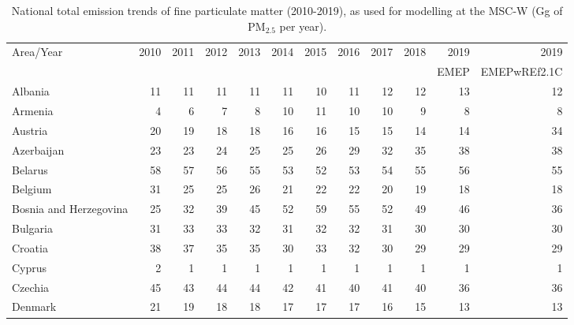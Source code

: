  \begin{table}
  \caption{National total emission trends of fine particulate matter (2010-2019), as used for modelling at the MSC-W (Gg of PM$_{2.5}$ per year).}
 
 \vspace{15pt}
 
 \scriptsize
 \centering
 \begin{tabular}{|l|r|r|r|r|r|r|r|r|r|r|r|}
 \hline
                     Area/Year&   2010&   2011&   2012&   2013&   2014&   2015&   2016&   2017&   2018&   2019& 2019 \\
                &&&&&&&&&&{\tiny EMEP}&{\tiny EMEPwREf2.1C}\\\hline\hline
                       Albania&     11&     11&     11&     11&     11&     10&     11&     12&     12&     13&     12\\\hline
                       Armenia&      4&      6&      7&      8&     10&     11&     10&     10&      9&      8&      8\\\hline
                       Austria&     20&     19&     18&     18&     16&     16&     15&     15&     14&     14&     34\\\hline
                    Azerbaijan&     23&     23&     24&     25&     25&     26&     29&     32&     35&     38&     38\\\hline
                       Belarus&     58&     57&     56&     55&     53&     52&     53&     54&     55&     56&     55\\\hline
                       Belgium&     31&     25&     25&     26&     21&     22&     22&     20&     19&     18&     18\\\hline
        Bosnia and Herzegovina&     25&     32&     39&     45&     52&     59&     55&     52&     49&     46&     36\\\hline
                      Bulgaria&     31&     33&     33&     32&     31&     32&     32&     31&     30&     30&     30\\\hline
                       Croatia&     38&     37&     35&     35&     30&     33&     32&     30&     29&     29&     29\\\hline
                        Cyprus&      2&      1&      1&      1&      1&      1&      1&      1&      1&      1&      1\\\hline
                       Czechia&     45&     43&     44&     44&     42&     41&     40&     41&     40&     36&     36\\\hline
                       Denmark&     21&     19&     18&     18&     17&     17&     17&     16&     15&     13&     13\\\hline

\end{tabular}
\end{table}
